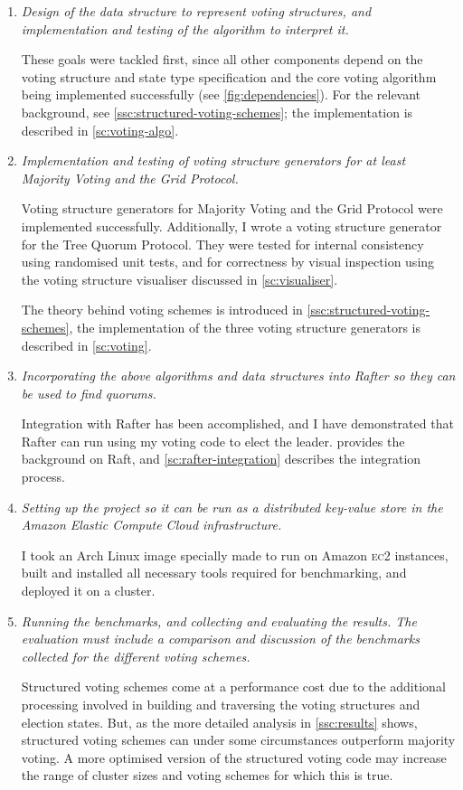 \documentclass[12pt,chapterprefix=true,toc=bibliography,numbers=noendperiod,
               footnotes=multiple,twoside]{scrreprt}
\newcommand{\ECC}[0]{\textsc{ec}2 }
\begin{document}
\begin{enumerate}
    \item \emph{Design of the data structure to represent voting structures, and implementation and testing of the algorithm to interpret it.}

        These goals were tackled first, since all other components depend on the voting structure and state type specification and the core voting algorithm being implemented successfully (see \cref{fig:dependencies}). For the relevant background, see \cref{ssc:structured-voting-schemes}; the implementation is described in \cref{sc:voting-algo}.
    \item \emph{Implementation and testing of voting structure generators for at least Majority Voting and the Grid Protocol.}

        Voting structure generators for Majority Voting and the Grid Protocol were implemented successfully. Additionally, I wrote a voting structure generator for the Tree Quorum Protocol. They were tested for internal consistency using randomised unit tests, and for correctness by visual inspection using the voting structure visualiser discussed in \cref{sc:visualiser}.

        The theory behind voting schemes is introduced in \cref{ssc:structured-voting-schemes}, the implementation of the three voting structure generators is described in \cref{sc:voting}.
    \item \emph{Incorporating the above algorithms and data structures into Rafter so they can be used to find quorums.}

        Integration with Rafter has been accomplished, and I have demonstrated that Rafter can run using my voting code to elect the leader.  provides the background on Raft, and \cref{sc:rafter-integration} describes the integration process.
    \item \emph{Setting up the project so it can be run as a distributed key-value store in the Amazon Elastic Compute Cloud infrastructure.}

        I took an Arch Linux image specially made to run on Amazon \ECC{} instances, built and installed all necessary tools required for benchmarking, and deployed it on a cluster.
    \item \emph{Running the benchmarks, and collecting and evaluating the results. The evaluation must include a comparison and discussion of the benchmarks collected for the different voting schemes.}

        Structured voting schemes come at a performance cost due to the additional processing involved in building and traversing the voting structures and election states. But, as the more detailed analysis in \cref{ssc:results} shows, structured voting schemes can under some circumstances outperform majority voting. A more optimised version of the structured voting code may increase the range of cluster sizes and voting schemes for which this is true.
\end{enumerate}
\end{document}
